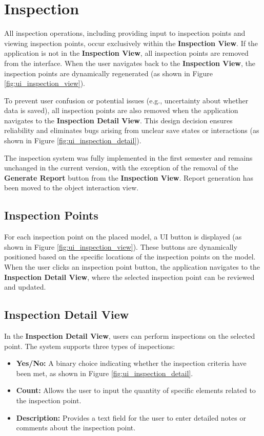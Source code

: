 \section{Inspection}

All inspection operations, including providing input to inspection points and viewing inspection points, occur exclusively within the \textbf{Inspection View}. If the application is not in the \textbf{Inspection View}, all inspection points are removed from the interface. When the user navigates back to the \textbf{Inspection View}, the inspection points are dynamically regenerated (as shown in Figure \ref{fig:ui_inspection_view}).

To prevent user confusion or potential issues (e.g., uncertainty about whether data is saved), all inspection points are also removed when the application navigates to the \textbf{Inspection Detail View}. This design decision ensures reliability and eliminates bugs arising from unclear save states or interactions (as shown in Figure \ref{fig:ui_inspection_detail}).

The inspection system was fully implemented in the first semester and remains unchanged in the current version, with the exception of the removal of the \textbf{Generate Report} button from the \textbf{Inspection View}. Report generation has been moved to the object interaction view.

\subsection{Inspection Points}
For each inspection point on the placed model, a UI button is displayed (as shown in Figure \ref{fig:ui_inspection_view}). These buttons are dynamically positioned based on the specific locations of the inspection points on the model. When the user clicks an inspection point button, the application navigates to the \textbf{Inspection Detail View}, where the selected inspection point can be reviewed and updated.

\subsection{Inspection Detail View}
In the \textbf{Inspection Detail View}, users can perform inspections on the selected point. The system supports three types of inspections:
\begin{itemize}
    \item \textbf{Yes/No:} A binary choice indicating whether the inspection criteria have been met, as shown in Figure \ref{fig:ui_inspection_detail}.
    \item \textbf{Count:} Allows the user to input the quantity of specific elements related to the inspection point.
    \item \textbf{Description:} Provides a text field for the user to enter detailed notes or comments about the inspection point.
\end{itemize}

